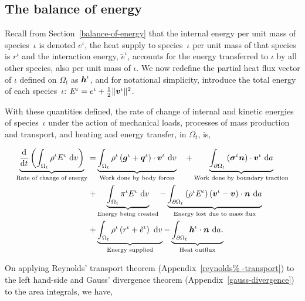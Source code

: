 \subsection{The balance of energy}
\label{eu-balance-of-energy}

Recall from Section~\ref{balance-of-energy} that the internal energy
per unit mass of species~$\iota$ is denoted $e^\iota$, the heat supply
to species~$\iota$ per unit mass of that species is $r^\iota$ and the
interaction energy, $\tilde{e}^\iota$, accounts for the energy
transferred to $\iota$ by all other species, also per unit mass of
$\iota$. We now redefine the partial heat flux vector of $\iota$
defined on $\Omega_{t}$ as $\mbox{\boldmath$ h$}^\iota$, and for notational simplicity,
introduce the total energy of each species~$\iota$: $E^{\iota} =
e^\iota + \frac{1}{2} \Vert\mbox{\boldmath$ v$}^\iota\Vert^2$.

With these quantities defined, the rate of change of internal and
kinetic energies of species~$\iota$ under the action of mechanical
loads, processes of mass production and transport, and heating and
energy transfer, in $\Omega_{t}$, is,

\begin{equation}
\begin{split}
\underbrace{\frac{\mathrm{d}}{\mathrm{d}t}\left(\int_{\Omega_{t}}
  \rho^{\iota} E^{\iota}\ \mathrm{d}v \right)}_{\text{Rate of change
    of energy}} = & \underbrace{\int_{\Omega_{t}} \rho^{\iota}
  \left(\mbox{\boldmath$ g$}^{\iota} +
  \mbox{\boldmath$ q$}^{\iota}\right)\cdot\mbox{\boldmath$ v$}^{\iota}\ \mathrm{d}v}_{\text{Work done by
    body forces}}\quad + \underbrace{\int_{\partial \Omega_{t}}
  \left(\mbox{\boldmath$\sigma$}^{\iota}\mbox{\boldmath$ n$}\right)
  \cdot\mbox{\boldmath$ v$}^{\iota}\ \mathrm{d}a}_{\text{Work done by boundary
    traction}}\\ + & \underbrace{\int_{\Omega_{t}}
  \pi^{\iota}E^{\iota}\ \mathrm{d}v}_{\text{Energy being created}} -
\underbrace{\int_{\partial \Omega_{t}} \left(\rho^{\iota} E^{\iota}
  \right) \left(\mbox{\boldmath$ v$}^{\iota} - \mbox{\boldmath$ v$}\right) \cdot
  \mbox{\boldmath$ n$}\ \mathrm{d}a}_{\text{Energy lost due to mass flux}} \\ +
&\underbrace{\int_{\Omega_{t}} \rho^{\iota} \left(r^{\iota} +
  \tilde{e}^{\iota} \right)\ \mathrm{d}v}_{\text{Energy supplied}} -
\underbrace{\int_{\partial \Omega_{t}}
  \mbox{\boldmath$ h$}^{\iota}\cdot\mbox{\boldmath$ n$}\ \mathrm{d}a.}_{\text{Heat outflux}}
\end{split}
\label{eu-globalbalanceofenergy}
\end{equation}

On applying Reynolds' transport theorem (Appendix~\ref{reynolds%
  -transport}) to the left hand-side and Gauss' divergence theorem
(Appendix~\ref{gauss-divergence}) to the area integrals, we have,

